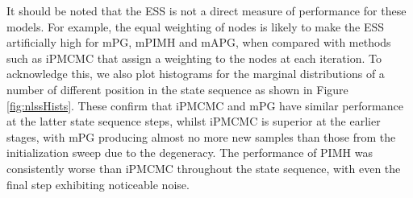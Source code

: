 It should be noted that the ESS is not a direct measure of performance for these models.  For example, the equal weighting of nodes is likely to make the ESS artificially high for mPG, mPIMH and mAPG, when compared with methods such as iPMCMC that assign a weighting to the nodes at each iteration.  To acknowledge this, we also plot histograms for the marginal distributions of a number of different position in the state sequence as shown in Figure \ref{fig:nlssHists}.  These confirm that iPMCMC and mPG have similar performance at the latter state sequence steps, whilst iPMCMC is superior at the earlier stages, with mPG producing almost no more new samples than those from the initialization sweep due to the degeneracy.  The performance of PIMH was consistently worse than iPMCMC throughout the state sequence, with even the final step exhibiting noticeable noise.

